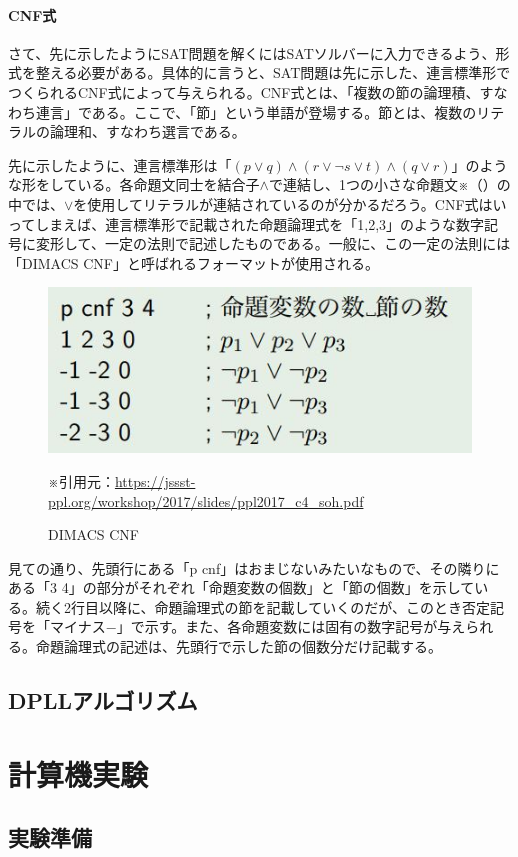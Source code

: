\documentclass[dvipdfmx]{jsarticle}
\begin{document}
\paragraph{CNF式}さて、先に示したようにSAT問題を解くにはSATソルバーに入力できるよう、形式を整える必要がある。具体的に言うと、SAT問題は先に示した、連言標準形でつくられるCNF式によって与えられる。CNF式とは、「複数の節の論理積、すなわち連言」である。ここで、「節」という単語が登場する。節とは、複数のリテラルの論理和、すなわち選言である。\par
先に示したように、連言標準形は「$(p \vee q) \wedge (r \vee \neg s \vee t) \wedge (q \vee r)$」のような形をしている。各命題文同士を結合子$\wedge$で連結し、1つの小さな命題文※（）の中では、$\vee$を使用してリテラルが連結されているのが分かるだろう。CNF式はいってしまえば、連言標準形で記載された命題論理式を「1,2,3」のような数字記号に変形して、一定の法則で記述したものである。一般に、この一定の法則には「DIMACS CNF」と呼ばれるフォーマットが使用される。
\begin{figure}[H]
  \centering
  \includegraphics[scale=0.6]{cap2.JPG}
  \caption{DIMACS CNF}
  ※引用元：\url{https://jssst-ppl.org/workshop/2017/slides/ppl2017_c4_soh.pdf}
\end{figure}
見ての通り、先頭行にある「p cnf」はおまじないみたいなもので、その隣りにある「3 4」の部分がそれぞれ「命題変数の個数」と「節の個数」を示している。続く2行目以降に、命題論理式の節を記載していくのだが、このとき否定記号を「マイナス$-$」で示す。また、各命題変数には固有の数字記号が与えられる。命題論理式の記述は、先頭行で示した節の個数分だけ記載する。
\subsection{DPLLアルゴリズム}
\section{計算機実験}
\subsection{実験準備}
\end{document}
